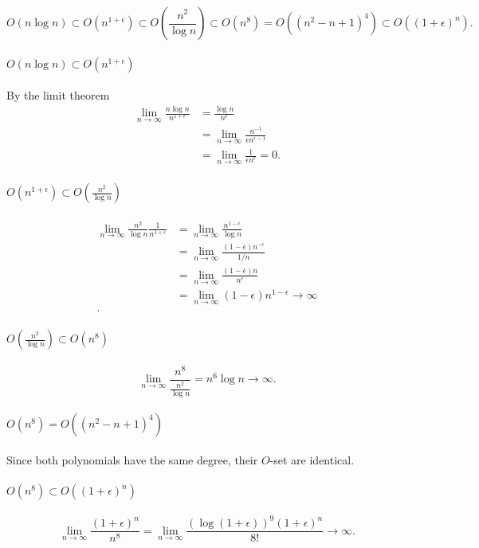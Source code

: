  

\[
    O(n \log n) \subset O(n^{1+\epsilon}) \subset O(\frac{n^2}{\log n}) \subset  O(n^{8}) = O((n^2-n+1)^{4}) \subset O((1+\epsilon)^{n})
.\] 

\paragraph{$O(n \log n) \subset O(n^{1+\epsilon})$}
By the limit theorem
\begin{align*}
    \lim_{n \to \infty} \frac{n \log n}{n^{1+\epsilon}} &= \frac{\log n}{n^{\epsilon}} \\
    &= \lim_{n \to \infty} \frac{n^{-1}}{\epsilon n^{\epsilon-1}} \\
    &= \lim_{n \to \infty} \frac{1}{\epsilon n^{\epsilon}} = 0
.\end{align*}

\paragraph{$O(n^{1+\epsilon}) \subset O(\frac{n^2}{\log n})$}
\begin{align*}
    \lim_{n \to \infty} \frac{n^2}{\log n} \frac{1}{n^{1+\epsilon}} &= \lim_{n \to \infty} \frac{n^{1-\epsilon}}{\log n} \\
    &= \lim_{n \to \infty} \frac{(1-\epsilon)n^{-\epsilon}}{1 / n} \\
    &= \lim_{n \to \infty} \frac{(1-\epsilon)n}{n^{\epsilon}} \\
    &= \lim_{n \to \infty} (1-\epsilon)n^{1-\epsilon} \to \infty \\
.\end{align*}

\paragraph{$O(\frac{n^2}{\log n}) \subset  O(n^{8})$}
\[
    \lim_{n \to \infty} \frac{n^{8}}{\frac{n^2}{\log n}} = n^{6} \log n \to \infty
.\] 

\paragraph{$O(n^{8}) = O((n^2-n+1)^{4})$}
Since both polynomials have the same degree, their $O$-set are identical.

\paragraph{$O(n^{8}) \subset O((1+\epsilon)^{n})$}
\[
    \lim_{n \to \infty} \frac{(1+\epsilon)^{n}}{n^{8}} = \lim_{n \to \infty} \frac{(\log (1+\epsilon))^{9} (1+\epsilon)^{n}}{8!} \to \infty
.\] 

